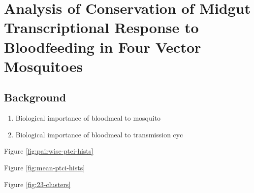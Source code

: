 \chapter{Analysis of Conservation of Midgut Transcriptional Response to Bloodfeeding in Four Vector Mosquitoes}



\section{Background}
\begin{enumerate}
 \item Biological importance of bloodmeal to mosquito
 \item Biological importance of bloodmeal to transmission cyc
\end{enumerate}



Figure \ref{fig:pairwise-ptci-hists}


Figure \ref{fig:mean-ptci-hists}



Figure \ref{fig:23-clusters}

% 
% 
% 
% 
% 
% 
% 
% 



